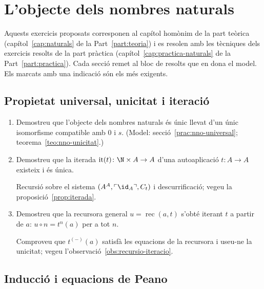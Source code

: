 \chapter{L'objecte dels nombres naturals}\label{cap:exercicis-naturals}

Aquests exercicis proposats corresponen al capítol homònim de la part teòrica (capítol~\ref{cap:naturals} de la Part~\ref{part:teoria}) i es resolen amb les tècniques dels exercicis resolts de la part pràctica (capítol~\ref{cap:practica-naturals} de la Part~\ref{part:practica}). Cada secció remet al bloc de resolts que en dona el model. Els marcats amb una indicació són els més exigents.

\section{Propietat universal, unicitat i iteració}

\begin{enumerate}
  \item Demostreu que l'objecte dels nombres naturals és únic llevat d'un únic isomorfisme compatible amb \(0\) i \(s\). (Model: secció~\ref{prac:nno-universal}; teorema~\ref{teo:nno-unicitat}.)

  \item Demostreu que la iterada \(\operatorname{it}(t)\colon\N\times A\to A\) d'una autoaplicació \(t\colon A\to A\) existeix i és única. \begin{indicacio}Recursió sobre el sistema \((A^{A},\ulcorner\id_A\urcorner,C_t)\) i descurrificació; vegeu la proposició~\ref{prop:iterada}.\end{indicacio}

  \item Demostreu que la recursora general \(u=\operatorname{rec}(a,t)\) s'obté iterant \(t\) a partir de \(a\): \(u\circ n=t^{n}(a)\) per a tot \(n\). \begin{indicacio}Comproveu que \(t^{(-)}(a)\) satisfà les equacions de la recursora i useu-ne la unicitat; vegeu l'observació~\ref{obs:recursio-iteracio}.\end{indicacio}
\end{enumerate}

\section{Inducció i equacions de Peano}

